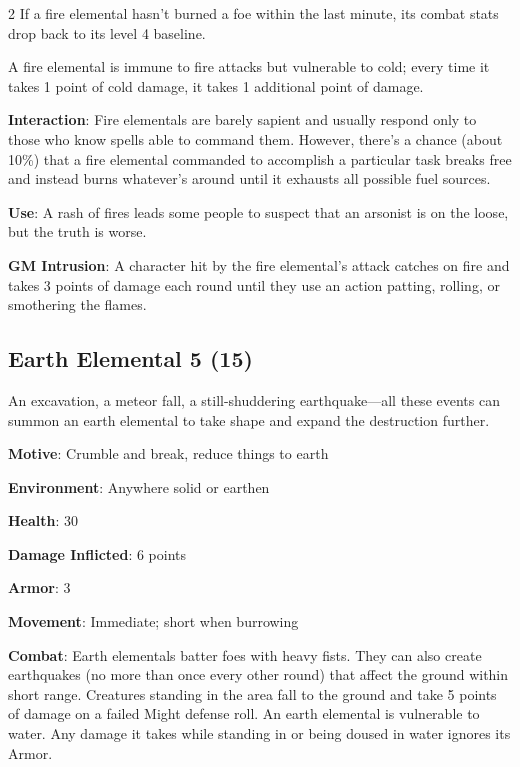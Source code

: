 \begin{multicols}{2}
If a fire elemental hasn’t burned a foe within the last minute, its combat stats drop back to its level 4 baseline.

A fire elemental is immune to fire attacks but vulnerable to cold; every time it takes 1 point of cold damage, it takes 1 additional point of damage.

\textbf{Interaction}: Fire elementals are barely sapient and usually respond only to those who know spells able to command them. However, there’s a chance (about 10\%) that a fire elemental commanded to accomplish a particular task breaks free and instead burns whatever’s around until it exhausts all possible fuel sources.

\textbf{Use}: A rash of fires leads some people to suspect that an arsonist is on the loose, but the truth is worse.

\textbf{GM Intrusion}: A character hit by the fire elemental’s attack catches on fire and takes 3 points of damage each round until they use an action patting, rolling, or smothering the flames.

\subsection{Earth Elemental	5 (15)}

An excavation, a meteor fall, a still-shuddering earthquake—all these events can summon an earth elemental to take shape and expand the destruction further.

\textbf{Motive}: Crumble and break, reduce things to earth

\textbf{Environment}: Anywhere solid or earthen

\textbf{Health}: 30

\textbf{Damage Inflicted}: 6 points

\textbf{Armor}: 3

\textbf{Movement}: Immediate; short when burrowing

\textbf{Combat}: Earth elementals batter foes with heavy fists. They can also create earthquakes (no more than once every other round) that affect the ground within short range. Creatures standing in the area fall to the ground and take 5 points of damage on a failed Might defense roll. 
An earth elemental is vulnerable to water. Any damage it takes while standing in or being doused in water ignores its Armor.


\end{multicols}
